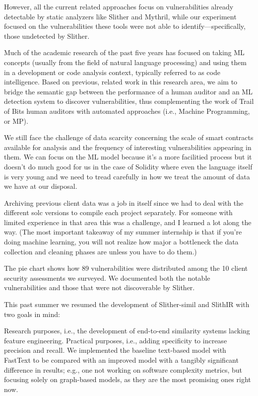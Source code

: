 However, all the current related approaches focus on vulnerabilities already detectable by static analyzers like Slither and Mythril, while our experiment focused on the vulnerabilities these
tools were not able to identify—specifically, those undetected by Slither.

Much of the academic research of the past five years has focused on taking ML concepts (usually from the field of natural language processing) and using them in a development or code analysis context,
typically referred to as code intelligence.
Based on previous, related work in this research area, we aim to bridge the semantic gap between the performance of a human auditor and an ML detection system to discover vulnerabilities, thus
complementing the work of Trail of Bits human auditors with automated approaches (i.e., Machine Programming, or MP).

We still face the challenge of data scarcity concerning the scale of smart contracts available for analysis and the frequency of interesting vulnerabilities appearing in them.
We can focus on the ML model because it's a more facilitied process but it doesn't do much good for us in the case of Solidity where even the language itself is very young and we need to
tread carefully in
how we
treat the amount of data we have at our disposal.

Archiving previous client data was a job in itself since we had to deal with the different solc versions to compile each project separately.
For someone with limited experience in that area this was a challenge, and I learned a lot along the way. (The most important takeaway of my summer internship is that if you're doing machine
learning, you will not realize how major a bottleneck the data collection and cleaning phases are unless you have to do them.)

The pie chart shows how 89 vulnerabilities were distributed among the 10 client security assessments we surveyed.
We documented both the notable vulnerabilities and those that were not discoverable by Slither.

This past summer we resumed the development of Slither-simil and SlithIR with two goals in mind:

Research purposes, i.e., the development of end-to-end similarity systems lacking feature engineering.
Practical purposes, i.e., adding specificity to increase precision and recall.
We implemented the baseline text-based model with FastText to be compared with an improved model with a tangibly significant difference in results;
e.g., one not working on software complexity metrics, but focusing solely on graph-based models, as they are the most promising ones right now.

